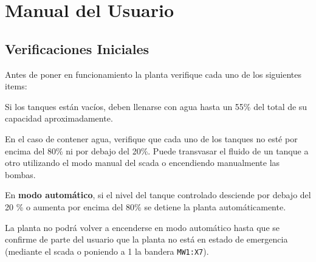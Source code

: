 \chapter{Manual del Usuario}
\label{anexo:manualUsuario}

\section{Verificaciones Iniciales}
\label{anexo:verificaciones}
Antes de poner en funcionamiento la planta verifique cada uno de los siguientes
items:

\begin{tcolorbox}[title=Nivel de agua]
Si los tanques están vacíos, deben llenarse con agua hasta un 55\%
del total de su capacidad aproximadamente.

En el caso de contener agua, verifique que cada uno de los tanques no esté por
encima del 80\% ni por debajo del 20\%.
Puede transvasar el fluido de un tanque a otro utilizando el modo manual del
\gls{scada} o encendiendo manualmente las bombas.
\end {tcolorbox}
\begin{lattention}
En \textbf{modo automático}, si el nivel del tanque controlado desciende por
debajo del
20 \% o aumenta por encima del 80\% se detiene la planta automáticamente.

La planta no podrá volver a encenderse en modo automático hasta que se confirme
de parte del usuario que la planta no está en estado de emergencia (mediante el
\gls{scada} o poniendo a 1 la bandera \verb|MW1:X7|).
\end{lattention}

